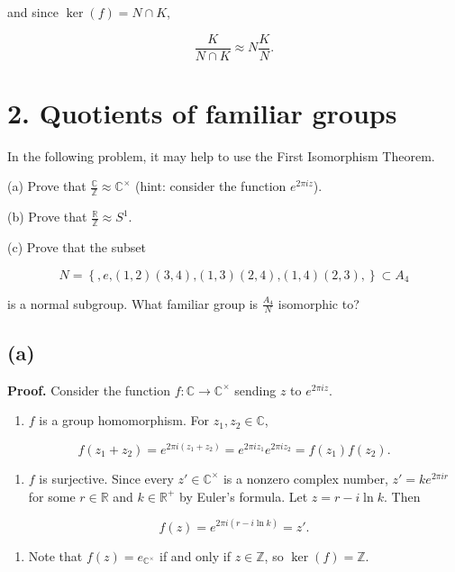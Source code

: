 and since \(\ker(f) = N \cap K\),

\[\frac{K}{N \cap K} \approx N\frac{K}{N}.\]

\section{2. Quotients of familiar groups}

In the following problem, it may help to use the First Isomorphism Theorem.

(a) Prove that \(\frac{\mathbb{C}}{\mathbb{Z}} \approx \mathbb{C}^{\times}\) (hint: consider the function \(e^{2\pi iz}\)).

(b) Prove that \(\frac{\mathbb{R}}{\mathbb{Z}} \approx S^{1}\).

(c) Prove that the subset

\[N = \left\{ {,e\text{,}\left( {1,2} \right)\left( {3,4} \right)\text{,}\left( {1,3} \right)\left( {2,4} \right)\text{,}\left( {1,4} \right)\left( {2,3} \right),} \right\} \subset A_{4}\]

is a normal subgroup. What familiar group is \(\frac{A_{4}}{N}\) isomorphic to?

\subsection{(a)}

\textbf{Proof.} Consider the function \(f:\mathbb{C}\rightarrow\mathbb{C}^{\times}\) sending \(z\) to \(e^{2\pi iz}\).

\begin{enumerate}
\tightlist
\item
  \(f\) is a group homomorphism. For \(z_{1},z_{2} \in \mathbb{C}\),
\end{enumerate}

\[f\left( {z_{1} + z_{2}} \right) = e^{2\pi i{({z_{1} + z_{2}})}} = e^{2\pi iz_{1}}e^{2\pi iz_{2}} = f\left( z_{1} \right)f\left( z_{2} \right).\]

\begin{enumerate}
\tightlist
\item
  \(f\) is surjective. Since every \(z' \in \mathbb{C}^{\times}\) is a nonzero complex number, \(z' = ke^{2\pi ir}\) for some \(r \in \mathbb{R}\) and \(k \in \mathbb{R}^{+}\) by Euler's formula. Let \(z = r - i\ln k\). Then
\end{enumerate}

\[f(z) = e^{2\pi i{({r - i\ln k})}} = z'.\]

\begin{enumerate}
\tightlist
\item
  Note that \(f(z) = e_{\mathbb{C}^{\times}}\) if and only if \(z \in \mathbb{Z}\), so \(\ker(f) = \mathbb{Z}\).
\end{enumerate}

